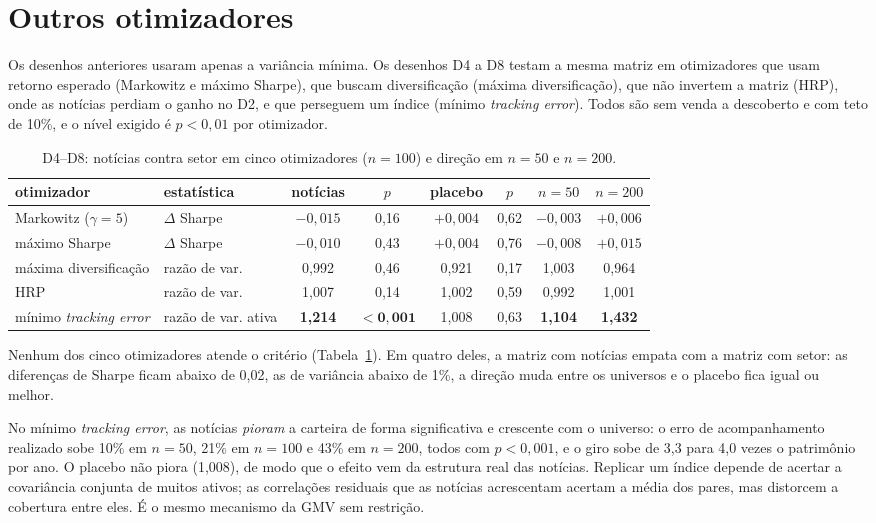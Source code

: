 \section{Outros otimizadores}
\label{sec:d4}

Os desenhos anteriores usaram apenas a variância mínima. Os desenhos D4 a D8 testam a mesma matriz em
otimizadores que usam retorno esperado (Markowitz e máximo Sharpe), que buscam diversificação (máxima
diversificação), que não invertem a matriz (HRP), onde as notícias perdiam o ganho no D2, e que perseguem
um índice (mínimo \emph{tracking error}). Todos são sem venda a descoberto e com teto de 10\%, e o nível exigido
é $p<0{,}01$ por otimizador.

\begin{table}[htbp]
\centering
\small
\caption{D4--D8: notícias contra setor em cinco otimizadores ($n=100$) e direção em $n=50$ e $n=200$.}
\label{tab:d4}
\begin{tabularx}{\textwidth}{>{\raggedright\arraybackslash}Xlcccccc}
\toprule
otimizador & estatística & notícias & $p$ & placebo & $p$ & $n=50$ & $n=200$ \\
\midrule
Markowitz ($\gamma=5$) & $\Delta$ Sharpe & $-0{,}015$ & 0,16 & $+0{,}004$ & 0,62 & $-0{,}003$ & $+0{,}006$ \\
máximo Sharpe & $\Delta$ Sharpe & $-0{,}010$ & 0,43 & $+0{,}004$ & 0,76 & $-0{,}008$ & $+0{,}015$ \\
máxima diversificação & razão de var. & 0,992 & 0,46 & 0,921 & 0,17 & 1,003 & 0,964 \\
HRP & razão de var. & 1,007 & 0,14 & 1,002 & 0,59 & 0,992 & 1,001 \\
mínimo \emph{tracking error} & razão de var. ativa & \textbf{1,214} & $\mathbf{<0{,}001}$ & 1,008 & 0,63 & \textbf{1,104} & \textbf{1,432} \\
\bottomrule
\end{tabularx}
\end{table}

Nenhum dos cinco otimizadores atende o critério (Tabela~\ref{tab:d4}). Em quatro deles, a matriz com
notícias empata com a matriz com setor: as diferenças de Sharpe ficam abaixo de 0,02, as de variância abaixo
de 1\%, a direção muda entre os universos e o placebo fica igual ou melhor.

No mínimo \emph{tracking error}, as notícias \emph{pioram} a carteira de forma significativa e crescente com o
universo: o erro de acompanhamento realizado sobe 10\% em $n=50$, 21\% em $n=100$ e 43\% em $n=200$, todos
com $p<0{,}001$, e o giro sobe de 3,3 para 4,0 vezes o patrimônio por ano. O placebo não piora (1,008), de modo
que o efeito vem da estrutura real das notícias. Replicar um índice depende de acertar a covariância
conjunta de muitos ativos; as correlações residuais que as notícias acrescentam acertam a média dos pares,
mas distorcem a cobertura entre eles. É o mesmo mecanismo da GMV sem restrição.

